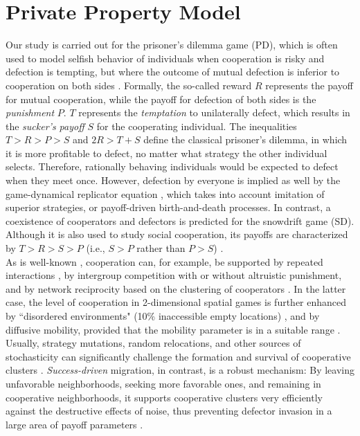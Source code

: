 \section*{Private Property Model}
Our study is carried out for the prisoner's dilemma game (PD), which is often used to model selfish behavior of individuals when cooperation is risky and defection is tempting, but where the outcome of mutual defection is inferior to cooperation on both sides \cite{axelrod1981evolution,nowak2006five}. 
Formally, the so-called reward $R$ represents the payoff for mutual cooperation, while the payoff for defection of both sides is the {\it punishment} $P$. $T$ represents the {\it temptation} to unilaterally defect, which results in the {\it sucker's payoff} $S$ for the cooperating individual. The inequalities $T > R > P > S$ and $2R > T + S$ define the classical prisoner's dilemma, in which it is more profitable to defect, no matter what strategy the other individual selects. Therefore, rationally behaving individuals would be expected to defect when they meet once. However, defection by everyone is implied as well by the game-dynamical replicator equation \cite{epstein1998zones}, which takes into account imitation of superior strategies, or payoff-driven birth-and-death processes. In contrast, a coexistence of cooperators and defectors is predicted for the snowdrift game (SD). Although it is also used to study social cooperation, its payoffs are characterized by $T > R > S > P$ (i.e., $S > P$ rather than $P > S$) \cite{}.\\

As is well-known \cite{nowak2006five}, cooperation can, for example, be supported by repeated interactions \cite{axelrod1981evolution}, by intergroup competition with or without altruistic punishment\cite{traulsen2006evolution,fehr2002altruistic,boyd2003evolution}, and by network reciprocity based on the clustering of cooperators \cite{nowak1992evolutionary,szabo2002phase,hauert2004spatial}. In the latter case, the level of cooperation in 2-dimensional spatial games is further enhanced by ``disordered environments" (10\% inaccessible empty locations) \cite{vainstein2001disordered}, and by
diffusive mobility, provided that the mobility parameter is in a suitable range \cite{vainstein2007does}. Usually, strategy mutations, random relocations, and other sources of stochasticity can significantly challenge the formation and survival of cooperative clusters \cite{}. {\it Success-driven} migration, in contrast, is a robust mechanism: By leaving unfavorable neighborhoods, seeking more favorable
ones, and remaining in cooperative neighborhoods, it supports cooperative clusters very efficiently against the destructive effects of noise, thus preventing defector invasion in a large area of payoff parameters \cite{helbing2009outbreak}.\\

